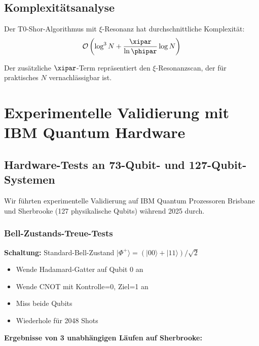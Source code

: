 \subsection{Komplexitätsanalyse}

\begin{proposition}
	Der T0-Shor-Algorithmus mit $\xi$-Resonanz hat durchschnittliche Komplexität:
	\begin{equation}
		\mathcal{O}\left(\log^3 N + \frac{\xipar}{\ln \phipar} \log N\right)
	\end{equation}
\end{proposition}

Der zusätzliche $\xipar$-Term repräsentiert den $\xi$-Resonanzscan, der für praktisches $N$ vernachlässigbar ist.

\section{Experimentelle Validierung mit IBM Quantum Hardware}
\label{sec:ibm_validation}

\subsection{Hardware-Tests an 73-Qubit- und 127-Qubit-Systemen}

Wir führten experimentelle Validierung auf IBM Quantum Prozessoren Brisbane und Sherbrooke (127 physikalische Qubits) während 2025 durch.

\subsubsection{Bell-Zustands-Treue-Tests}

\begin{experimentbox}
	\textbf{Schaltung:} Standard-Bell-Zustand $|\Phi^+\rangle = (|00\rangle + |11\rangle)/\sqrt{2}$
	\begin{itemize}
		\item Wende Hadamard-Gatter auf Qubit 0 an
		\item Wende CNOT mit Kontrolle=0, Ziel=1 an
		\item Miss beide Qubits
		\item Wiederhole für 2048 Shots
	\end{itemize}
\end{experimentbox}

\textbf{Ergebnisse von 3 unabhängigen Läufen auf Sherbrooke:}

